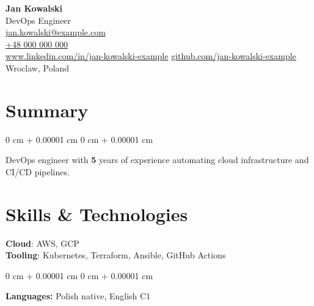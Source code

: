 \documentclass[10pt, letterpaper]{article}
\newenvironment{onecolentry}{
    \begin{adjustwidth}{
        0 cm + 0.00001 cm
    }{
        0 cm + 0.00001 cm
    }
}{
    \end{adjustwidth}
}
\newenvironment{header}{
    \setlength{\topsep}{0pt}\par\kern\topsep\centering\linespread{1.5}
}{
    \par\kern\topsep
}
\begin{document}
\newcommand{\AND}{\unskip
    \cleaders\copy\ANDbox\hskip\wd\ANDbox
    \ignorespaces
}
\newsavebox\ANDbox
\sbox\ANDbox{$|$}

\begin{header}
    {\fontsize{21 pt}{21 pt}\selectfont \textbf{Jan Kowalski}} \\[0.16cm]
            {\fontsize{11 pt}{11 pt}\selectfont DevOps Engineer} \\[0.10cm]

    \href{mailto:jan.kowalski@example.com}{jan.kowalski@example.com} \\
            \vspace{0.05cm}
            \href{tel:+48000000000}{+48 000 000 000} \\
            \vspace{0.05cm}
            \href{https://www.linkedin.com/in/jan-kowalski-example}{www.linkedin.com/in/jan-kowalski-example}
            \vspace{0.05cm}
            \href{https://github.com/jan-kowalski-example}{github.com/jan-kowalski-example}
            \vspace{0.05cm}
            \newline Wroclaw, Poland
\end{header}

\vspace{0.08 cm}
\section{Summary}
\begin{onecolentry}
DevOps engineer with \textbf{5} years of experience automating cloud infrastructure and CI/CD pipelines.
\end{onecolentry}
\section{Skills \& Technologies}
\vspace{0.05 cm}
\textbf{Cloud}: AWS, GCP \\
\vspace{0.05 cm}
\textbf{Tooling}: Kubernetes, Terraform, Ansible, GitHub Actions \\
\vspace{0.05 cm}
\begin{onecolentry}
\textbf{Languages:} Polish native, English C1
\end{onecolentry}
\end{document}
